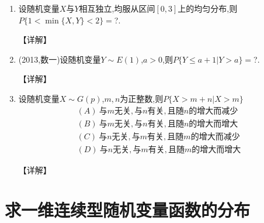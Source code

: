\documentclass[12pt, a4paper, oneside, UTF8]{ctexbook}
\begin{document}
\begin{enumerate}[label=\arabic*.,start=6]
    \item  设随机变量$X$与$Y$相互独立,均服从区间$[0,3]$上的均匀分布,则$P\{1<\min\{X,Y\}<2\}=$?.
    
    \begin{solution}
    【详解】
    \end{solution}
    
    \item  (2013,数一)设随机变量$Y\sim E(1)$,$a>0$,则$P\{Y\leq a+1|Y>a\}=$?.
    
    \begin{solution}
    【详解】
    \end{solution}
    
    \item  设随机变量$X\sim G(p)$,$m,n$为正整数,则$P\{X>m+n|X>m\}$
    \begin{align*}
        (A)\ 与m无关,与n有关,且随n的增大而减少 \\
        (B)\ 与m无关,与n有关,且随n的增大而增大 \\
        (C)\ 与n无关,与m有关,且随m的增大而减少 \\
        (D)\ 与n无关,与m有关,且随m的增大而增大
    \end{align*}
    
    \begin{solution}
    【详解】
    \end{solution}
\end{enumerate}

\section{求一维连续型随机变量函数的分布}
\end{document}
